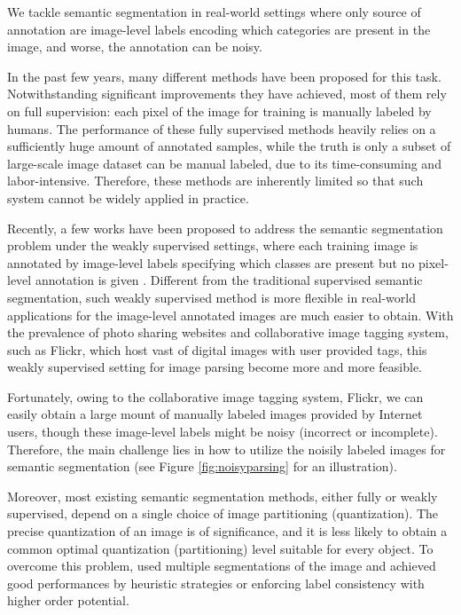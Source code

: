 We tackle semantic segmentation in real-world settings where only source of annotation are image-level labels encoding which categories are present in the image, and worse, the annotation can be noisy.

In the past few years, many different methods \cite{csurka2011efficient,gonfaus2010harmony,ladicky2009associative,nowozin2010parameter,shotton2008semantic,shotton2006textonboost,singh2013nonparametric,verbeek2007scene,yang2007multiple,yao2012describing} have been proposed for this task. Notwithstanding significant improvements they have achieved, most of them rely on full supervision: each pixel of the image for training is manually labeled by humans. The performance of these fully supervised methods heavily relies on a sufficiently huge amount of annotated samples, while the truth is only a subset of large-scale image dataset can be manual labeled, due to its time-consuming and labor-intensive. Therefore, these methods are inherently limited so that such system cannot be widely applied in practice.

Recently, a few works have been proposed to address the semantic segmentation problem under the weakly supervised settings, where each training image is annotated by image-level labels specifying which classes are present but no pixel-level annotation is given \cite{verbeek2007region,vezhnevets2010towards,vezhnevets2011weakly,vezhnevets2012weakly,xu2014tell,zhang2013sparse,zhang2013probabilistic}. Different from the traditional supervised semantic segmentation, such weakly supervised method is more flexible in real-world applications for the image-level annotated images are much easier to obtain. With the prevalence of photo sharing websites and collaborative image tagging system, such as Flickr, which host vast of digital images with user provided tags, this weakly supervised setting for image parsing become more and more feasible.

 Fortunately, owing to the collaborative image tagging system, \eg Flickr, we can easily obtain a large mount of manually labeled images provided by Internet users, though these image-level labels might be noisy (incorrect or incomplete). Therefore, the main challenge lies in how to utilize the noisily labeled images for semantic segmentation (see Figure \ref{fig:noisyparsing} for an illustration).


 Moreover, most existing semantic segmentation methods, either fully or weakly supervised, depend on a single choice of image partitioning (quantization). The precise quantization of an image is of significance, and it is less likely to obtain a common optimal quantization (partitioning) level suitable for every object. To overcome this problem, \cite{hoiem2005geometric,kohli2009robust,ladicky2009associative,nowozin2010parameter,russell2006using} used multiple segmentations of the image and achieved good performances by heuristic strategies or enforcing label consistency with higher order potential.

